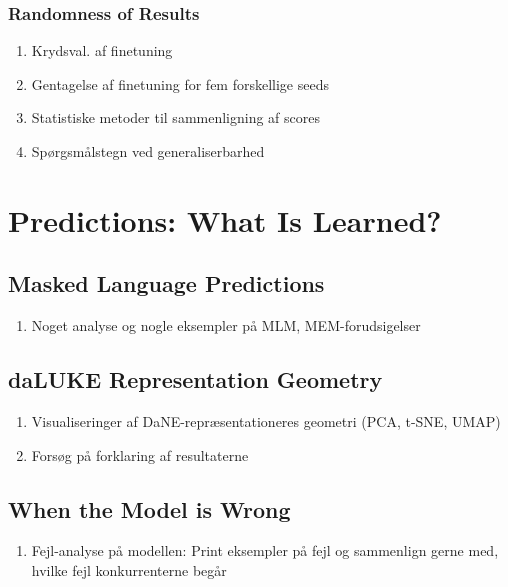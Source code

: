 \documentclass[main.tex]{subfiles}
\begin{document}
\subsubsection{Randomness of Results}
\begin{enumerate}
    \item Krydsval. af finetuning
    \item Gentagelse af finetuning for fem forskellige seeds
    \item Statistiske metoder til sammenligning af scores
    \item Spørgsmålstegn ved generaliserbarhed
\end{enumerate}

\section{Predictions: What Is Learned?}

\subsection{Masked Language Predictions}
\begin{enumerate}
    \item Noget analyse og nogle eksempler på MLM, MEM-forudsigelser
\end{enumerate}

\subsection{daLUKE Representation Geometry}

\begin{enumerate}
    \item Visualiseringer af DaNE-repræsentationeres geometri (PCA, t-SNE, UMAP)
    \item Forsøg på forklaring af resultaterne
\end{enumerate}

\subsection{When the Model is Wrong}

\begin{enumerate}
    \item Fejl-analyse på modellen: Print eksempler på fejl og sammenlign gerne med, hvilke fejl konkurrenterne begår
\end{enumerate}
\end{document}

